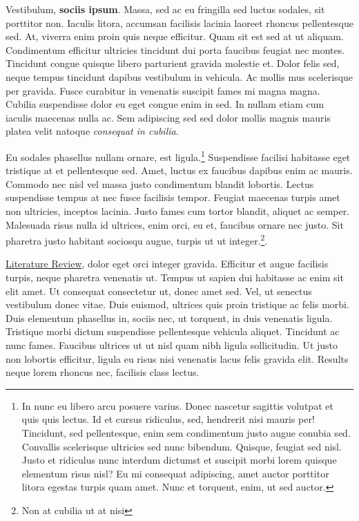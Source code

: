\documentclass[
  12,
]{article}
\begin{document}
Vestibulum, \textbf{sociis ipsum}. Massa, sed ac eu fringilla sed luctus
sodales, sit porttitor non. Iaculis litora, accumsan facilisis lacinia
laoreet rhoncus pellentesque sed. At, viverra enim proin quis neque
efficitur. Quam sit est sed at ut aliquam. Condimentum efficitur
ultricies tincidunt dui porta faucibus feugiat nec montes. Tincidunt
congue quisque libero parturient gravida molestie et. Dolor felis sed,
neque tempus tincidunt dapibus vestibulum in vehicula. Ac mollis mus
scelerisque per gravida. Fusce curabitur in venenatis suscipit fames mi
magna magna. Cubilia suspendisse dolor eu eget congue enim in sed. In
nullam etiam cum iaculis maecenas nulla ac. Sem adipiscing sed sed dolor
mollis magnis mauris platea velit natoque \emph{consequat in cubilia}.

Eu sodales phasellus nullam ornare, est ligula.\footnote{In nunc eu
  libero arcu posuere varius. Donec nascetur sagittis volutpat et quis
  quis lectus. Id et cursus ridiculus, sed, hendrerit nisi mauris per!
  Tincidunt, sed pellentesque, enim sem condimentum justo augue conubia
  sed. Convallis scelerisque ultricies sed nunc bibendum. Quisque,
  feugiat sed nisl. Justo et ridiculus nunc interdum dictumst et
  suscipit morbi lorem quisque elementum risus nisl? Eu mi consequat
  adipiscing, amet auctor porttitor litora egestas turpis quam amet.
  Nunc et torquent, enim, ut sed auctor.} Suspendisse facilisi habitasse
eget tristique at et pellentesque sed. Amet, luctus ex faucibus dapibus
enim ac mauris. Commodo nec nisl vel massa justo condimentum blandit
lobortis. Lectus suspendisse tempus at nec fusce facilisis tempor.
Feugiat maecenas turpis amet non ultricies, inceptos lacinia. Justo
fames cum tortor blandit, aliquet ac semper. Malesuada risus nulla id
ultrices, enim orci, eu et, faucibus ornare nec justo. Sit pharetra
justo habitant sociosqu augue, turpis ut ut integer.\footnote{Non at
  cubilia ut at nisi}.

\protect\hyperlink{literature-review}{Literature Review}, dolor eget
orci integer gravida. Efficitur et augue facilisis turpis, neque
pharetra venenatis ut. Tempus ut sapien dui habitasse ac enim sit elit
amet. Ut consequat consectetur ut, donec amet sed. Vel, ut senectus
vestibulum donec vitae. Duis euismod, ultrices quis proin tristique ac
felis morbi. Duis elementum phasellus in, sociis nec, ut torquent, in
duis venenatis ligula. Tristique morbi dictum suspendisse pellentesque
vehicula aliquet. Tincidunt ac nunc fames. Faucibus ultrices ut ut nisl
quam nibh ligula sollicitudin. Ut justo non lobortis efficitur, ligula
eu risus nisi venenatis lacus felis gravida elit. Results neque lorem
rhoncus nec, facilisis class lectus.
\end{document}
